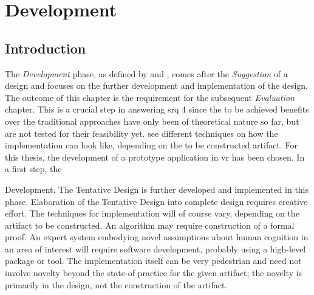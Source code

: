 
\chapter{Development}

\label{ChapterDevelopment}


\section{Introduction}

The \textit{Development} phase, as defined by \cite{Vaishnavi2008} and \cite{Hevner2010}, comes after the \textit{Suggestion} of a design and focuses on the further development and implementation of the design. The outcome of this chapter is the requirement for the subsequent \textit{Evaluation} chapter. This is a crucial step in answering \gls{srq} 4 since the to be achieved benefits over the traditional approaches have only been of theoretical nature so far, but are not tested for their feasibility yet. \cite{Vaishnavi2008} see different techniques on how the implementation can look like, depending on the to be constructed artifact. For this thesis, the development of a prototype application in \gls{vr} has been chosen. In a first step, the

Development. The Tentative Design is further developed and implemented in this phase. Elaboration of the Tentative Design into complete design requires creative effort. The techniques for implementation will of course vary, depending on the artifact to be constructed. An algorithm may require construction of a formal proof. An expert system embodying novel assumptions about human cognition in an area of interest will require software development, probably using a high-level package or tool. The implementation itself can be very pedestrian and need not involve novelty beyond the state-of-practice for the given artifact; the novelty is primarily in the design, not the construction of the artifact.
\cite{Vaishnavi2008}


